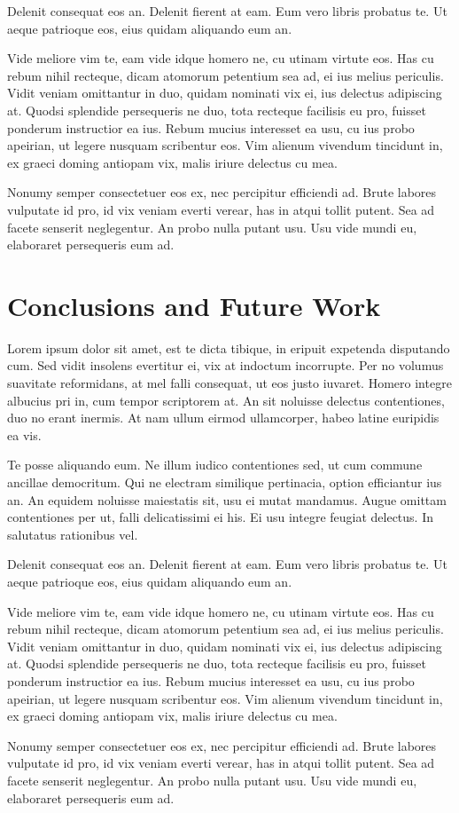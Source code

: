 \documentclass[10pt, letterpapper]{proc}
\begin{document}
Delenit consequat eos an. Delenit fierent at eam. Eum vero libris probatus te. Ut aeque patrioque eos, eius quidam aliquando eum an.

Vide meliore vim te, eam vide idque homero ne, cu utinam virtute eos. Has cu rebum nihil recteque, dicam atomorum petentium sea ad, ei ius melius periculis. Vidit veniam omittantur in duo, quidam nominati vix ei, ius delectus adipiscing at. Quodsi splendide persequeris ne duo, tota recteque facilisis eu pro, fuisset ponderum instructior ea ius. Rebum mucius interesset ea usu, cu ius probo apeirian, ut legere nusquam scribentur eos. Vim alienum vivendum tincidunt in, ex graeci doming antiopam vix, malis iriure delectus cu mea.

Nonumy semper consectetuer eos ex, nec percipitur efficiendi ad. Brute labores vulputate id pro, id vix veniam everti verear, has in atqui tollit putent. Sea ad facete senserit neglegentur. An probo nulla putant usu. Usu vide mundi eu, elaboraret persequeris eum ad.

\section{Conclusions and Future Work}
Lorem ipsum dolor sit amet, est te dicta tibique, in eripuit expetenda disputando cum. Sed vidit insolens evertitur ei, vix at indoctum incorrupte. Per no volumus suavitate reformidans, at mel falli consequat, ut eos justo iuvaret. Homero integre albucius pri in, cum tempor scriptorem at. An sit noluisse delectus contentiones, duo no erant inermis. At nam ullum eirmod ullamcorper, habeo latine euripidis ea vis.

Te posse aliquando eum. Ne illum iudico contentiones sed, ut cum commune ancillae democritum. Qui ne electram similique pertinacia, option efficiantur ius an. An equidem noluisse maiestatis sit, usu ei mutat mandamus. Augue omittam contentiones per ut, falli delicatissimi ei his. Ei usu integre feugiat delectus. In salutatus rationibus vel.

Delenit consequat eos an. Delenit fierent at eam. Eum vero libris probatus te. Ut aeque patrioque eos, eius quidam aliquando eum an.

Vide meliore vim te, eam vide idque homero ne, cu utinam virtute eos. Has cu rebum nihil recteque, dicam atomorum petentium sea ad, ei ius melius periculis. Vidit veniam omittantur in duo, quidam nominati vix ei, ius delectus adipiscing at. Quodsi splendide persequeris ne duo, tota recteque facilisis eu pro, fuisset ponderum instructior ea ius. Rebum mucius interesset ea usu, cu ius probo apeirian, ut legere nusquam scribentur eos. Vim alienum vivendum tincidunt in, ex graeci doming antiopam vix, malis iriure delectus cu mea.

Nonumy semper consectetuer eos ex, nec percipitur efficiendi ad. Brute labores vulputate id pro, id vix veniam everti verear, has in atqui tollit putent. Sea ad facete senserit neglegentur. An probo nulla putant usu. Usu vide mundi eu, elaboraret persequeris eum ad.
\end{document}
